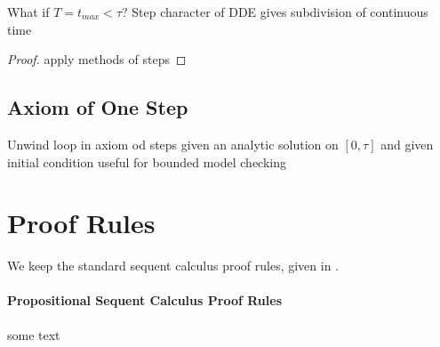 \documentclass[10pt]{report}
\begin{document}
        \begin{calculus}


        \end{calculus}

        What if $T=t_{max} < \tau$?
        Step character of DDE gives subdivision of continuous time

        \begin{proof}
            apply methods of steps
        \end{proof}

    \subsection{Axiom of One Step}
        \label{sex:axiom-of-one-step}

        Unwind loop in axiom od steps
        given an analytic solution on $[0,\tau]$ and given initial condition
        useful for bounded model checking

\section{Proof Rules}
    \label{sec:proof-rules}

    We keep the standard sequent calculus proof rules, given in \dL.

    \paragraph{Propositional Sequent Calculus Proof Rules}
        \label{sec:propositional-rules}

        some text
\end{document}
